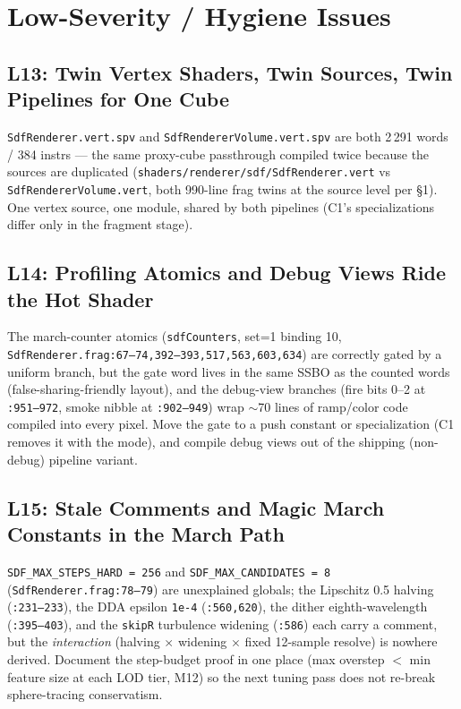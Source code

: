 \documentclass[11pt,a4paper]{article}
\begin{document}
\section{Low-Severity / Hygiene Issues}

\subsection{L13: Twin Vertex Shaders, Twin Sources, Twin Pipelines for One Cube}

\texttt{SdfRenderer.vert.spv} and \texttt{SdfRendererVolume.vert.spv} are
both 2\,291 words / 384 instrs --- the same proxy-cube passthrough compiled
twice because the sources are duplicated
(\texttt{shaders/renderer/sdf/SdfRenderer.vert} vs
\texttt{SdfRendererVolume.vert}, both 990-line frag twins at the source
level per \S1). One vertex source, one module, shared by both pipelines (C1's
specializations differ only in the fragment stage).

\subsection{L14: Profiling Atomics and Debug Views Ride the Hot Shader}

The march-counter atomics (\texttt{sdfCounters}, set=1 binding 10,
\texttt{SdfRenderer.frag:67--74,392--393,517,563,603,634}) are correctly
gated by a uniform branch, but the gate word lives in the same SSBO as the
counted words (false-sharing-friendly layout), and the debug-view branches
(fire bits 0--2 at \texttt{:951--972}, smoke nibble at \texttt{:902--949})
wrap $\sim$70 lines of ramp/color code compiled into every pixel. Move the
gate to a push constant or specialization (C1 removes it with the mode), and
compile debug views out of the shipping (non-debug) pipeline variant.

\subsection{L15: Stale Comments and Magic March Constants in the March Path}

\texttt{SDF\_MAX\_STEPS\_HARD = 256} and \texttt{SDF\_MAX\_CANDIDATES = 8}
(\texttt{SdfRenderer.frag:78--79}) are unexplained globals; the Lipschitz
0.5 halving (\texttt{:231--233}), the DDA epsilon \texttt{1e-4}
(\texttt{:560,620}), the dither eighth-wavelength (\texttt{:395--403}), and
the \texttt{skipR} turbulence widening (\texttt{:586}) each carry a comment,
but the \emph{interaction} (halving $\times$ widening $\times$ fixed 12-sample
resolve) is nowhere derived. Document the step-budget proof in one place
(max overstep $<$ min feature size at each LOD tier, M12) so the next tuning
pass does not re-break sphere-tracing conservatism.
\end{document}
